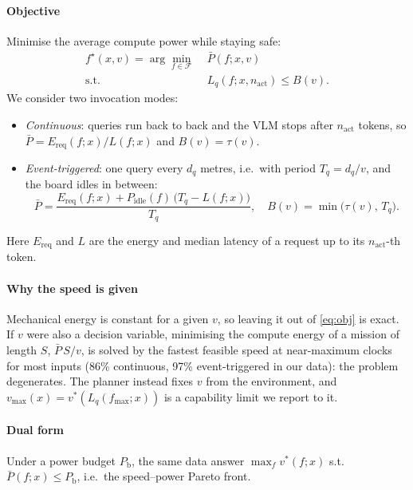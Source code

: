 \documentclass[conference]{IEEEtran}
\newcommand{\Lq}{L_{q}}
\newcommand{\nact}{n_{\mathrm{act}}}
\begin{document}
\paragraph{Objective}
Minimise the average compute power while staying safe:
\begin{align}
  f^\star(x, v) = \arg\min_{f\in\mathcal{F}} \;& \bar P(f; x, v)  \label{eq:obj}\\
  \text{s.t.}\;& \Lq(f; x, \nact) \le B(v). \nonumber
\end{align}
We consider two invocation modes:
\begin{itemize}
  \item \emph{Continuous}: queries run back to back and the VLM stops after $\nact$ tokens, so
        $\bar P = E_{\mathrm{req}}(f;x)/L(f;x)$ and $B(v) = \tau(v)$.
  \item \emph{Event-triggered}: one query every $d_q$ metres, i.e.\ with period $T_q = d_q/v$, and the board idles in between:
        \begin{equation}
          \bar P = \frac{E_{\mathrm{req}}(f;x) + P_{\mathrm{idle}}(f)\,\bigl(T_q - L(f;x)\bigr)}{T_q},
          \quad B(v) = \min\bigl(\tau(v),\, T_q\bigr).
        \end{equation}
\end{itemize}
Here $E_{\mathrm{req}}$ and $L$ are the energy and median latency of a request up to its $\nact$-th token.

\paragraph{Why the speed is given}
Mechanical energy is constant for a given $v$, so leaving it out of \cref{eq:obj} is exact.
If $v$ were also a decision variable, minimising the compute energy of a mission of length $S$,
$\bar P\, S/v$, is solved by the fastest feasible speed at near-maximum clocks for most inputs (86\%
continuous, 97\% event-triggered in our data): the problem degenerates.
The planner instead fixes $v$ from the environment, and $v_{\max}(x) = v^*(\Lq(f_{\max};x))$ is a
capability limit we report to it.
\paragraph{Dual form}
Under a power budget $P_{\mathrm{b}}$, the same data answer
$\max_f v^*(f;x)$ s.t.\ $\bar P(f;x) \le P_{\mathrm{b}}$, i.e.\ the speed–power Pareto front.

\end{document}
